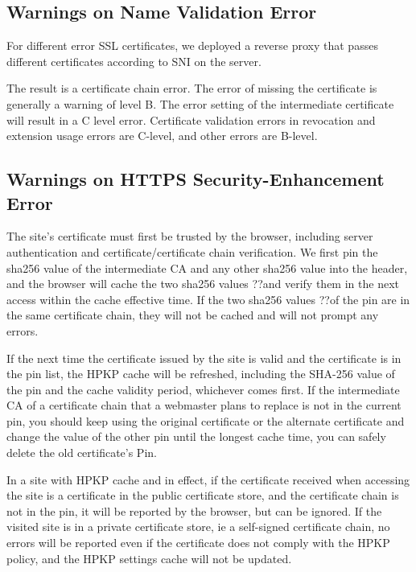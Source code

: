 \subsection{Warnings on Name Validation Error}


For different error SSL certificates, we deployed a reverse proxy that passes different certificates according to SNI on the server.

The result is a certificate chain error. The error of missing the certificate is generally a warning of level B. The error setting of the intermediate certificate will result in a C level error. Certificate validation errors in revocation and extension usage errors are C-level, and other errors are B-level.




\subsection{Warnings on HTTPS Security-Enhancement Error}
The site's certificate must first be trusted by the browser, including server authentication and certificate/certificate chain verification. We first pin the sha256 value of the intermediate CA and any other sha256 value into the header, and the browser will cache the two sha256 values ??and verify them in the next access within the cache effective time. If the two sha256 values ??of the pin are in the same certificate chain, they will not be cached and will not prompt any errors.

If the next time the certificate issued by the site is valid and the certificate is in the pin list, the HPKP cache will be refreshed, including the SHA-256 value of the pin and the cache validity period, whichever comes first. If the intermediate CA of a certificate chain that a webmaster plans to replace is not in the current pin, you should keep using the original certificate or the alternate certificate and change the value of the other pin until the longest cache time, you can safely delete the old certificate's Pin.

In a site with HPKP cache and in effect, if the certificate received when accessing the site is a certificate in the public certificate store, and the certificate chain is not in the pin, it will be reported by the browser, but can be ignored. If the visited site is in a private certificate store, ie a self-signed certificate chain, no errors will be reported even if the certificate does not comply with the HPKP policy, and the HPKP settings cache will not be updated.


